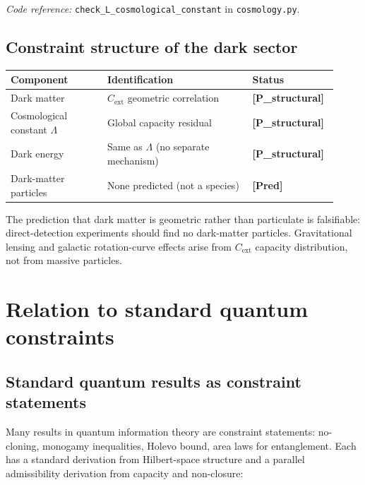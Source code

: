 \documentclass[11pt]{article}
\newcommand{\coderef}[2]{\smallskip\noindent\textit{Code reference:} \texttt{#1} in \texttt{#2}.}
\newcommand{\epitag}[1]{\textbf{[#1]}}
\theoremstyle{definition}
\begin{document}
\coderef{check\_L\_cosmological\_constant}{cosmology.py}

\subsection{Constraint structure of the dark sector}\label{sec:dark_sector_constraints}

\begin{center}\small
\begin{tabular}{@{}>{\raggedright\arraybackslash}p{0.28\linewidth} >{\raggedright\arraybackslash}p{0.42\linewidth} >{\raggedright\arraybackslash}p{0.22\linewidth}@{}}
\toprule
\textbf{Component} & \textbf{Identification} & \textbf{Status} \\
\midrule
Dark matter & $C_{\mathrm{ext}}$ geometric correlation & \epitag{P\_structural} \\
Cosmological constant $\Lambda$ & Global capacity residual & \epitag{P\_structural} \\
Dark energy & Same as $\Lambda$ (no separate mechanism) & \epitag{P\_structural} \\
Dark-matter particles & None predicted (not a species) & \epitag{Pred} \\
\bottomrule
\end{tabular}
\end{center}

The prediction that dark matter is geometric rather than particulate is falsifiable: direct-detection experiments should find no dark-matter particles. Gravitational lensing and galactic rotation-curve effects arise from $C_{\mathrm{ext}}$ capacity distribution, not from massive particles.

\section{Relation to standard quantum constraints}\label{sec:relation_quantum}

\subsection{Standard quantum results as constraint statements}\label{sec:quantum_constraint_statements}

Many results in quantum information theory are constraint statements: no-cloning, monogamy inequalities, Holevo bound, area laws for entanglement. Each has a standard derivation from Hilbert-space structure and a parallel admissibility derivation from capacity and non-closure:
\end{document}
